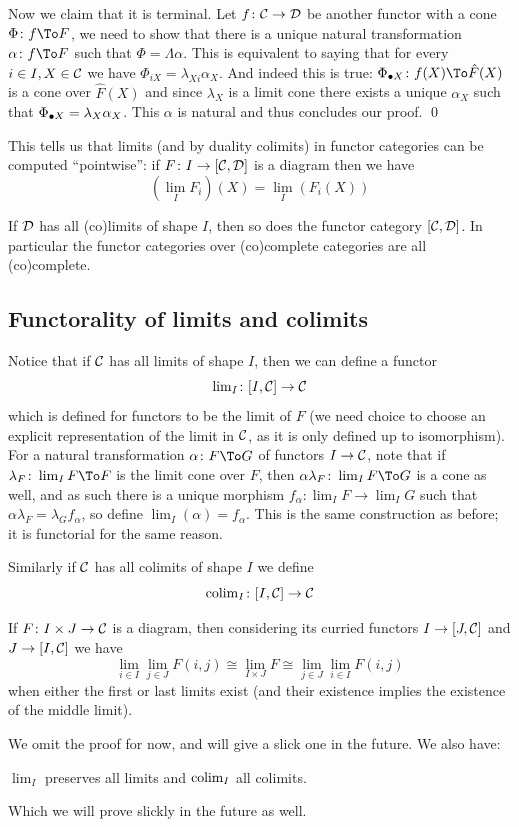     Now we claim that it is terminal.
    Let $f\colon{{\cal C}}\to{{\cal D}}$ be another functor with a cone $\Phi\colon f\To F$, we need to show that there is a unique natural transformation $\alpha\colon f\To F$ such that $\Phi=\Lambda\alpha$.
    This is equivalent to saying that for every $i\in I,X\in{{\cal C}}$ we have $\Phi_{iX}=\lambda_{Xi}\alpha_X$.
    And indeed this is true: $\Phi_{\bul X}\colon f(X)\To\hat F(X)$ is a cone over $\hat F(X)$ and since $\lambda_X$ is a limit cone there exists a unique $\alpha_X$ such that $\Phi_{\bullet X}=\lambda_X\alpha_X$.
    This $\alpha$ is natural and thus concludes our proof.
    \qed

\eproof

This tells us that limits (and by duality colimits) in functor categories can be computed ``pointwise'': if $F\colon I\to[{{\cal C}},{{\cal D}}]$ is a diagram then we have
$$ (\lim_IF_i)(X) = \lim_I(F_i(X)) $$

\bcoro

    If ${{\cal D}}$ has all (co)limits of shape $I$, then so does the functor category $[{{\cal C}},{{\cal D}}]$.
    In particular the functor categories over (co)complete categories are all (co)complete.

\ecoro

\subsection{Functorality of limits and colimits}

Notice that if ${{\cal C}}$ has all limits of shape $I$, then we can define a functor
$$ \mathop{\rm lim}\nolimits_I\colon[I,{{\cal C}}]\to{{\cal C}} $$
which is defined for functors to be the limit of $F$ (we need choice to choose an explicit representation of the limit in ${{\cal C}}$, as it is only defined up to isomorphism).
For a natural transformation $\alpha\colon F\To G$ of functors $I\to{{\cal C}}$, note that if $\lambda_F\colon\lim_IF\To F$ is the limit cone over $F$, then $\alpha\lambda_F\colon\lim_IF\To G$ is a cone as well,
and as such there is a unique morphism $f_\alpha\colon\lim_IF\to\lim_IG$ such that $\alpha\lambda_F=\lambda_Gf_\alpha$, so define $\lim_I(\alpha)=f_\alpha$.
This is the same construction as before; it is functorial for the same reason.

Similarly if ${{\cal C}}$ has all colimits of shape $I$ we define
$$ \mathop{\rm colim}\nolimits_I\colon[I,{{\cal C}}]\to{{\cal C}} $$

\bthrm

    If $F\colon I\times J\to{{\cal C}}$ is a diagram, then considering its curried functors $I\to[J,{{\cal C}}]$ and $J\to[I,{{\cal C}}]$ we have
    $$ \lim_{i\in I}\lim_{j\in J}F(i,j) \cong \lim_{I\times J}F \cong \lim_{j\in J}\lim_{i\in I}F(i,j) $$
    when either the first or last limits exist (and their existence implies the existence of the middle limit).

\ethrm

We omit the proof for now, and will give a slick one in the future.
We also have:

\bthrm

    $\lim_I$ preserves all limits and $\mathop{\rm colim}\nolimits_I$ all colimits.

\ethrm

Which we will prove slickly in the future as well.

